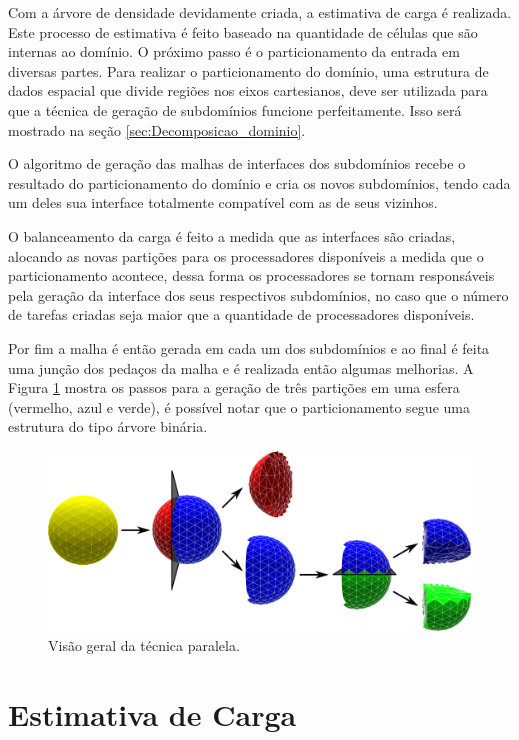 Com a árvore de densidade devidamente criada, a estimativa de carga é realizada. Este processo de estimativa é feito baseado na quantidade de células que são internas ao domínio. O próximo passo é o particionamento da entrada em diversas partes. Para realizar o particionamento do domínio, uma estrutura de dados espacial que divide regiões nos eixos cartesianos, deve ser utilizada para que a técnica de geração de subdomínios funcione perfeitamente. Isso será mostrado na seção \ref{sec:Decomposicao_dominio}.

O algoritmo de geração das malhas de interfaces dos subdomínios recebe o resultado do particionamento do domínio e cria os novos subdomínios, tendo cada um deles sua interface totalmente compatível com as de seus vizinhos.

O balanceamento da carga é feito a medida que as interfaces são criadas, alocando as novas partições para os processadores disponíveis a medida que o particionamento acontece, dessa forma os processadores se tornam responsáveis pela geração da interface dos seus respectivos subdomínios, no caso que o número de tarefas criadas seja maior que a quantidade de processadores disponíveis. 

Por fim a malha é então gerada em cada um dos subdomínios e ao final é feita uma junção dos pedaços da malha e é realizada então algumas melhorias. A Figura \ref{fig:fluxograma} mostra os passos para a geração de três partições em uma esfera (vermelho, azul e verde), é possível notar que o particionamento segue uma estrutura do tipo árvore binária.

\begin{figure}[!ht]
	\centering
	\includegraphics[width=1.0\textwidth]{fig/fluxograma_new.png}
	\caption{Visão geral da técnica paralela.}
	\label{fig:fluxograma}
\end{figure}


\section{Estimativa de Carga} 
\label{sec:Estimativa_de_Carga}


